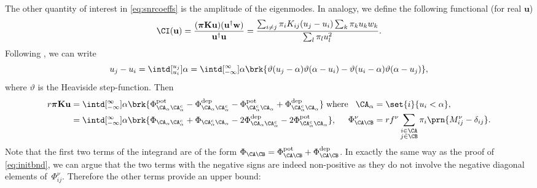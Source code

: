 \documentclass[12pt]{article}
\newcommand{\eqm}{\pi}
\newcommand{\eq}{\boldsymbol{\eqm}}
\newcommand{\wm}{w}
\newcommand{\w}{\mathbf{\wm}}
\newcommand{\MMdm}{M}
\newcommand{\encm}{K}
\newcommand{\enc}{\mathbf{\encm}}
\newcommand{\Fm}{\Phi}
\newcommand{\pot}{^{\text{pot}}}
\newcommand{\dep}{^{\text{dep}}}
\begin{document}
The other quantity of interest in \cref{eq:snrcoeffs} is the amplitude of the eigenmodes.
In analogy, we define the following functional (for real \(\mathbf{u}\))
%
\begin{equation*}
  \CI(\mathbf{u}) = \frac{(\eq \enc \mathbf{u}) (\mathbf{u}^\dag \w)}{\mathbf{u}^\dag \mathbf{u}}
      = \frac{\sum_{i \neq j} \eqm_i \encm_{ij} (u_j - u_i) \sum_k \eqm_k u_k \wm_k} 
             {\sum_{l} \eqm_l u_l^2} .
\end{equation*}
%
Following \cite{Lawler1988cheeger}, we can write
%
\begin{equation*}
  u_j - u_i = \intd[_{u_i}^{u_j}]{\alpha} 
      = \intd[_{-\infty}^{\infty}]{\alpha} 
        \brk{\vartheta(u_j - \alpha) \vartheta(\alpha - u_i) 
           - \vartheta(u_i - \alpha) \vartheta(\alpha - u_j)} ,
\end{equation*}
%
where \(\vartheta\) is the Heaviside step-function.
Then 
%
\begin{equation*}
  \begin{aligned}[t]
  r \eq \enc \mathbf{u} &= \intd[_{-\infty}^{\infty}]{\alpha}  \brk{
        \Fm\pot_{\CA_\alpha \CA_\alpha^c} - \Fm\dep_{\CA_\alpha \CA_\alpha^c} 
      - \Fm\pot_{\CA_\alpha^c \CA_\alpha} + \Fm\dep_{\CA_\alpha^c \CA_\alpha} }
  \; \text{where} 
    \\
    &= \intd[_{-\infty}^{\infty}]{\alpha}  \brk{
        \Fm_{\CA_\alpha \CA_\alpha^c} + \Fm_{\CA_\alpha^c \CA_\alpha} 
        - 2\Fm\dep_{\CA_\alpha \CA_\alpha^c} - 2\Fm\pot_{\CA_\alpha^c \CA_\alpha} } ,
  \end{aligned}
  \begin{aligned}[t]
    \CA_\alpha &= \set{i}{u_i < \alpha} , 
    \\
    \Fm^\nu_{\CA \CB} &= r f^\nu \sum_{\substack{i \in \CA \\ j \in \CB}} 
                        \eqm_i \prn{\MMdm^\nu_{ij} - \delta_{ij}} .
  \end{aligned}
\end{equation*}
%
Note that the first two terms of the integrand are of the form \( \Fm_{\CA \CB} = \Fm_{\CA \CB}\pot + \Fm_{\CA \CB}\dep \).
In exactly the same way as the proof of \cref{eq:initbnd}, we can argue that the two terms with the negative signs are indeed non-positive as they do not involve the negative diagonal elements of~\( \Fm_{ij}^\nu \).
Therefore the other terms provide an upper bound:
%
\end{document}
